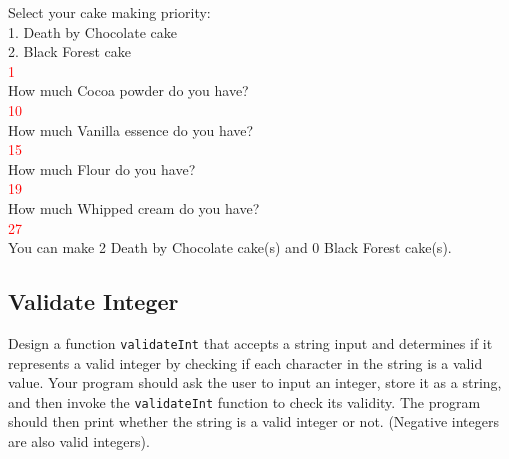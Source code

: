 \begin{sample}
Select your cake making priority:
\\1. Death by Chocolate cake
\\2. Black Forest cake
\\\textcolor{red}{1}
\\How much Cocoa powder do you have?
\\\textcolor{red}{10}
\\How much Vanilla essence do you have?
\\\textcolor{red}{15}
\\How much Flour do you have?
\\\textcolor{red}{19}
\\How much Whipped cream do you have?
\\\textcolor{red}{27}
\\You can make 2 Death by Chocolate cake(s) and 0 Black Forest cake(s).
\end{sample}





\subsection{Validate Integer}
Design a function \texttt{validateInt} that accepts a string input and determines if it represents a valid integer by checking if each character in the string is a valid value. Your program should ask the user to input an integer, store it as a string, and then invoke the \texttt{validateInt} function to check its validity. The program should then print whether the string is a valid integer or not. (Negative integers are also valid integers).


